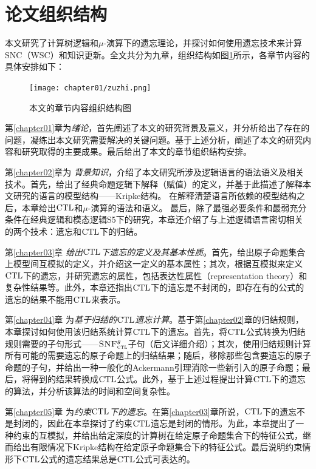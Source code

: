 \section{论文组织结构}
本文研究了计算树逻辑和$\mu$-演算下的遗忘理论，并探讨如何使用遗忘技术来计算SNC（WSC）和知识更新。全文共分为九章，组织结构如图\ref{fig:chapter1-research-structure}所示，各章节内容的具体安排如下：


\begin{figure}[htbp]
	\centering
	\texttt{[image: chapter01/zuzhi.png]}
	\caption{本文的章节内容组织结构图}
	\label{fig:chapter1-research-structure}
\end{figure}

第\ref{chapter01}章为\textit{绪论}，首先阐述了本文的研究背景及意义，并分析给出了存在的问题，凝练出本文研究需要解决的关键问题。基于上述分析，阐述了本文的研究内容和研究取得的主要成果。最后给出了本文的章节组织结构安排。


第\ref{chapter02}章为 {\em 背景知识}，介绍了本文研究所涉及逻辑语言的语法语义及相关技术。首先，给出了经典命题逻辑下解释（赋值）的定义，并基于此描述了解释本文研究的语言的模型结构——Kripke结构。
在解释清楚语言所依赖的模型结构之后，本章给出$\textrm{CTL}$和$\mu$-演算的语法和语义。
最后，除了最强必要条件和最弱充分条件在经典逻辑和模态逻辑S5下的研究，本章还介绍了与上述逻辑语言密切相关的两个技术：遗忘和$\textrm{CTL}$下的归结。



第\ref{chapter03}章 {\em 给出$\textrm{CTL}$下遗忘的定义及其基本性质}。首先，给出原子命题集合上模型间互模拟的定义，并介绍这一定义的基本属性；其次，根据互模拟来定义$\textrm{CTL}$下的遗忘，并研究遗忘的属性，包括表达性属性（representation theory）和复杂性结果等。此外，本章还指出$\textrm{CTL}$下的遗忘是不封闭的，即存在有的公式的遗忘的结果不能用$\textrm{CTL}$来表示。



第\ref{chapter04}章 为{\em 基于归结的$\textrm{CTL}$遗忘计算}。基于第\ref{chapter02}章的归结规则，本章探讨如何使用该归结系统计算$\textrm{CTL}$下的遗忘。首先，将$\textrm{CTL}$公式转换为归结规则需要的子句形式——${\textsc{SNF}_{\textsc{ctl}}^g}$子句（后文详细介绍）；其次，使用归结规则计算所有可能的需要遗忘的原子命题上的归结结果；随后，移除那些包含要遗忘的原子命题的子句，并给出一种一般化的Ackermann引理消除一些新引入的原子命题；最后，将得到的结果转换成$\textrm{CTL}$公式。此外，基于上述过程提出计算$\textrm{CTL}$下的遗忘的算法，并分析该算法的时间和空间复杂性。

第\ref{chapter05}章 为{\em 约束$\textrm{CTL}$下的遗忘}。在第\ref{chapter03}章所说，$\textrm{CTL}$下的遗忘不是封闭的，因此在本章探讨了约束$\textrm{CTL}$遗忘是封闭的情形。为此，本章提出了一种约束的互模拟，并给出给定深度的计算树在给定原子命题集合下的特征公式，继而给出有限情况下Kripke结构在给定原子命题集合下的特征公式。最后说明约束情形下$\textrm{CTL}$公式的遗忘结果总是$\textrm{CTL}$公式可表达的。




